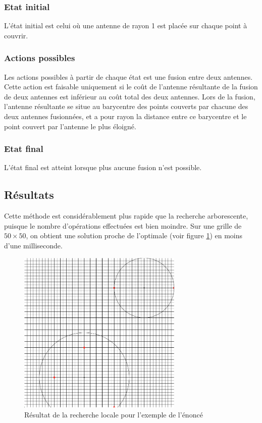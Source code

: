 \documentclass[12pt]{article}
\begin{document}
\subsubsection{Etat initial}
L'état initial est celui où une antenne de rayon 1 est placée sur chaque point à couvrir.

\subsubsection{Actions possibles}
Les actions possibles à partir de chaque état est une fusion entre deux antennes. Cette action est faisable uniquement si le coût de l'antenne résultante de la fusion de deux antennes est inférieur au coût total des deux antennes. Lors de la fusion, l'antenne résultante se situe au barycentre des points couverts par chacune des deux antennes fusionnées, et a pour rayon la distance entre ce barycentre et le point couvert par l'antenne le plus éloigné.

\subsubsection{Etat final}
L'état final est atteint lorsque plus aucune fusion n'est possible.


\subsection{Résultats}
Cette méthode est considérablement plus rapide que la recherche arborescente, puisque le nombre d'opérations effectuées est bien moindre. Sur une grille de $50 \times 50$, on obtient une solution proche de l'optimale (voir figure \ref{50x50}) en moins d'une milliseconde. 

\begin{figure}[H]
  \centering
  \includegraphics[width = 0.7\textwidth]{50x50}
  \caption{Résultat de la recherche locale pour l'exemple de l'énoncé}
  \label{50x50}
\end{figure}
\end{document}
